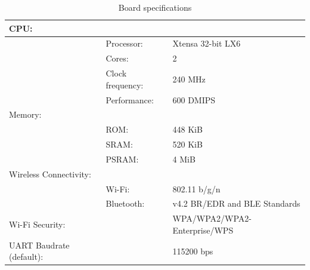 \begin{table}[H]
\begin{tabular}{lll}
CPU:                     &                                       &                                                    \\ \hline
\multicolumn{1}{l|}{}    & \multicolumn{1}{l|}{Processor:}       & \multicolumn{1}{l|}{Xtensa 32-bit LX6 \cite{ESP32Net}}             \\ \cline{2-3} 
\multicolumn{1}{l|}{}    & \multicolumn{1}{l|}{Cores:}           & \multicolumn{1}{l|}{2}                             \\ \cline{2-3} 
\multicolumn{1}{l|}{}    & \multicolumn{1}{l|}{Clock frequency:} & \multicolumn{1}{l|}{240 MHz \cite{ESP32Net}}                       \\ \cline{2-3} 
\multicolumn{1}{l|}{}    & \multicolumn{1}{l|}{Performance:}     & \multicolumn{1}{l|}{600 DMIPS \cite{ESP32Net}}                     \\ \cline{2-3} 
Memory:                  &                                       &                                                    \\ \hline
\multicolumn{1}{l|}{}    & \multicolumn{1}{l|}{ROM:}             & \multicolumn{1}{l|}{448 KiB \cite{ESP32Net}}                       \\ \cline{2-3} 
\multicolumn{1}{l|}{}    & \multicolumn{1}{l|}{SRAM:}            & \multicolumn{1}{l|}{520 KiB \cite{ESP32Net}}                       \\ \cline{2-3} 
\multicolumn{1}{l|}{}    & \multicolumn{1}{l|}{PSRAM:}           & \multicolumn{1}{l|}{4 MiB \cite{ESP32Net}}                         \\ \cline{2-3} 
Wireless Connectivity:   &                                       &                                                    \\ \hline
\multicolumn{1}{l|}{}    & \multicolumn{1}{l|}{Wi-Fi:}           & \multicolumn{1}{l|}{802.11 b/g/n \cite{ESP32Net}}                  \\ \cline{2-3} 
\multicolumn{1}{l|}{}    & \multicolumn{1}{l|}{Bluetooth:}       & \multicolumn{1}{l|}{v4.2 BR/EDR and BLE Standards \cite{ESP32Net}} \\ \cline{2-3} 
Wi-Fi Security:          & \multicolumn{1}{l|}{}                 & \multicolumn{1}{l|}{WPA/WPA2/WPA2-Enterprise/WPS \cite{LoborisEUESP32CAM}}  \\ \hline
UART Baudrate (default): & \multicolumn{1}{l|}{}                 & \multicolumn{1}{l|}{115200 bps \cite{LoborisEUESP32CAM}}                    \\ \hline
\end{tabular}
\caption{\label{tab:board-specifications}Board specifications}
\end{table}

